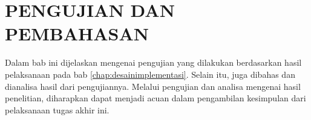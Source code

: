 \chapter{PENGUJIAN DAN PEMBAHASAN}
\label{chap:pengujiandanpembahasan}

Dalam bab ini dijelaskan mengenai pengujian yang dilakukan berdasarkan hasil pelaksanaan pada bab \ref{chap:desainimplementasi}. Selain itu, juga dibahas dan dianalisa hasil dari pengujiannya. Melalui pengujian dan analisa mengenai hasil penelitian, diharapkan dapat menjadi acuan dalam pengambilan kesimpulan dari pelaksanaan tugas akhir ini.





